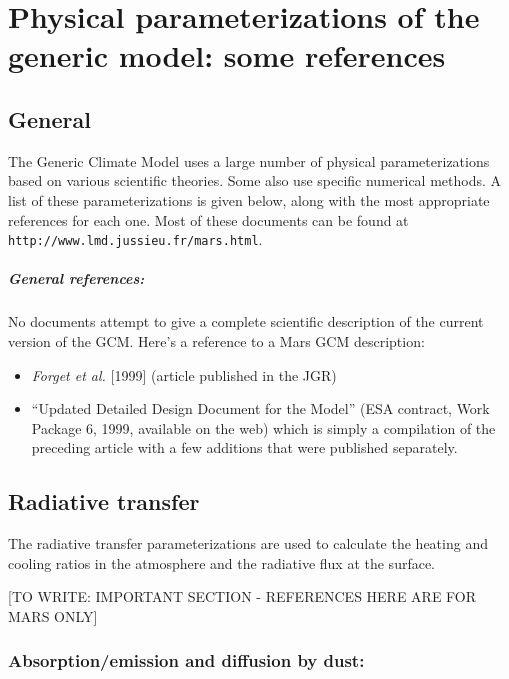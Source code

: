 \chapter{Physical parameterizations of the generic model: some references}

\label{sc:phystd}

\section{General}

The Generic Climate Model uses a large number of physical parameterizations based on various scientific theories. Some also use specific numerical methods. A list of these parameterizations is given below, along with the most appropriate references for each one. Most of these documents can be found at\\ 
\verb+http://www.lmd.jussieu.fr/mars.html+.

\paragraph{General references:}
No documents attempt to give a complete scientific description of the current
version of the GCM. Here's a reference to a Mars GCM description:
\begin{itemize}
\item  {\it Forget et al.} [1999] (article
published in the JGR)
\item  ``Updated Detailed Design Document for the Model''
(ESA contract, Work Package 6, 1999, available on the web)
which is simply a compilation of the preceding article with
a few additions that were published separately.
\end{itemize}

\nocite{Forg:99}

\section{Radiative transfer}

The radiative transfer parameterizations are used to calculate the heating
and cooling ratios in the atmosphere and the radiative flux at the surface.

[TO WRITE: IMPORTANT SECTION - REFERENCES HERE ARE FOR MARS ONLY]



\subsection{\bf Absorption/emission and diffusion by dust:}

